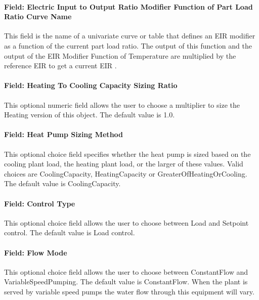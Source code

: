 \paragraph{Field: Electric Input to Output Ratio Modifier Function of Part Load Ratio Curve Name}\label{plhp_eir_heating_inputs_eirfplr}

This field is the name of a univariate curve or table that defines an EIR modifier as a function of the current part load ratio. The output of this function and the output of the EIR Modifier Function of Temperature are multiplied by the reference EIR to get a current EIR .

\paragraph{Field: Heating To Cooling Capacity Sizing Ratio}\label{plhp_eir_heating_inputs_heating_to_cooling_capacity_sizing_ratio}

This optional numeric field allows the user to choose a multiplier to size the Heating version of this object. The default value is 1.0. 

\paragraph{Field: Heat Pump Sizing Method}\label{plhp_eir_heating_inputs_heat_pump_sizing_method}

This optional choice field specifies whether the heat pump is sized based on the cooling plant load, the heating plant load, or the larger of these values. Valid choices are CoolingCapacity, HeatingCapacity or GreaterOfHeatingOrCooling. The default value is CoolingCapacity.

\paragraph{Field: Control Type}\label{plhp_eir_heating_inputs_control_type}

This optional choice field allows the user to choose between Load and Setpoint control. The default value is Load control.

\paragraph{Field: Flow Mode}\label{plhp_eir_heating_inputs_flow_mode}

This optional choice field allows the user to choose between ConstantFlow and VariableSpeedPumping. The default value is ConstantFlow. When the plant is served by variable speed pumps the water flow through this equipment will vary.

